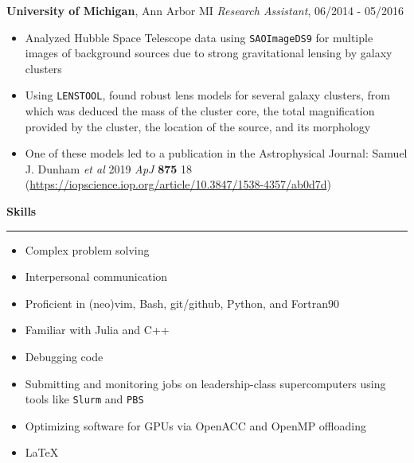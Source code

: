 \documentclass[10pt]{article}
\begin{document}
\textbf{University of Michigan}, Ann Arbor MI\newline
\textit{Research Assistant}, 06/2014 - 05/2016
\begin{itemize}\setlength\itemsep{0.1cm}
  \item
    Analyzed Hubble Space Telescope data using \texttt{SAOImageDS9}
    for multiple images of
    background sources due to strong gravitational lensing by galaxy clusters
  \item
    Using \texttt{LENSTOOL},
    found robust lens models for several galaxy clusters,
    from which was deduced the mass of the cluster core,
    the total magnification provided by the cluster,
    the location of the source, and its morphology
  \item
    One of these models led to a publication in the Astrophysical Journal:
    Samuel J. Dunham \textit{et al} 2019 \textit{ApJ} \textbf{875} 18
    (\url{https://iopscience.iop.org/article/10.3847/1538-4357/ab0d7d})
\end{itemize}
\vspace{1em}

\textbf{Skills}\vspace{0.5em}\hrule

\begin{itemize}\setlength\itemsep{0.1cm}
  \item
    Complex problem solving
  \item
    Interpersonal communication
  \item
    Proficient in (neo)vim, Bash, git/github, Python, and Fortran90
  \item
    Familiar with Julia and C++
  \item
    Debugging code
  \item
    Submitting and monitoring jobs
    on leadership-class supercomputers using tools like \texttt{Slurm}
    and \texttt{PBS}
  \item
    Optimizing software for GPUs via OpenACC and OpenMP offloading
  \item
    LaTeX
\end{itemize}
\end{document}
